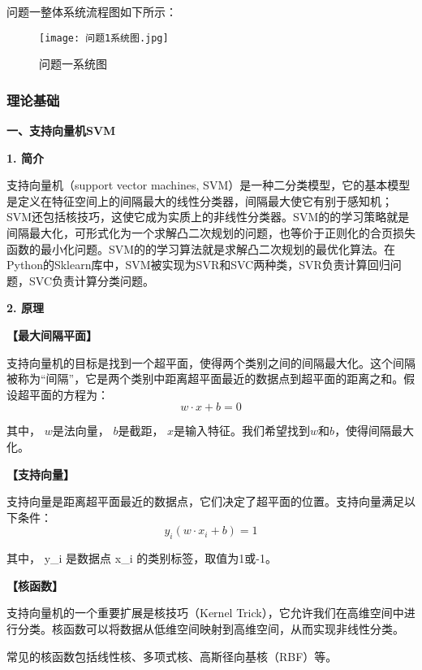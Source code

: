 \documentclass[bwprint]{gmcmthesis}
\begin{document}
				问题一整体系统流程图如下所示：
				
				\begin{figure}[H]
					\centering
					\texttt{[image: 问题1系统图.jpg]}
					\caption{问题一系统图}
					\label{fig:4}
				\end{figure}
				
			\subsubsection{理论基础}\label{lilun}
				\textbf{一、支持向量机SVM} 
				
				\textbf{1. 简介}
				
				支持向量机（support vector machines, SVM）是一种二分类模型，它的基本模型是定义在特征空间上的间隔最大的线性分类器，间隔最大使它有别于感知机；SVM还包括核技巧，这使它成为实质上的非线性分类器。SVM的的学习策略就是间隔最大化，可形式化为一个求解凸二次规划的问题，也等价于正则化的合页损失函数的最小化问题。SVM的的学习算法就是求解凸二次规划的最优化算法。在Python的Sklearn库中，SVM被实现为SVR和SVC两种类，SVR负责计算回归问题，SVC负责计算分类问题。
				
				\textbf{2. 原理}
				
				\textbf{【最大间隔平面】}
				
				支持向量机的目标是找到一个超平面，使得两个类别之间的间隔最大化。这个间隔被称为“间隔”，它是两个类别中距离超平面最近的数据点到超平面的距离之和。假设超平面的方程为：
				\begin{equation}
					w\cdot x+b=0 \nonumber
				\end{equation}
				
				其中， $w$是法向量， $b$是截距， $x$是输入特征。我们希望找到$w$和$b$，使得间隔最大化。
				
				\textbf{【支持向量】}
				
				支持向量是距离超平面最近的数据点，它们决定了超平面的位置。支持向量满足以下条件：
				\begin{equation}
					y_i(w\cdot x_i+b)=1 \nonumber
				\end{equation}
				
				其中， y\_i 是数据点 x\_i 的类别标签，取值为1或-1。
				
				\textbf{【核函数】}
				
				支持向量机的一个重要扩展是核技巧（Kernel Trick），它允许我们在高维空间中进行分类。核函数可以将数据从低维空间映射到高维空间，从而实现非线性分类。
				
				常见的核函数包括线性核、多项式核、高斯径向基核（RBF）等。
				
\end{document}
